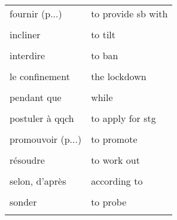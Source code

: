\documentclass[
  10pt,
]{article}
\begin{document}
\begin{longtable}{ll}
fournir (p...) & to provide sb with\\

\cellcolor{gray!6}{fournir (s...)} & \cellcolor{gray!6}{to supply sb with}\\

incliner & to tilt\\

\cellcolor{gray!6}{intenter un procès} & \cellcolor{gray!6}{to sue}\\

interdire & to ban\\

\cellcolor{gray!6}{la majorité écrasante} & \cellcolor{gray!6}{the overwhelming majority}\\

le confinement & the lockdown\\

\cellcolor{gray!6}{menacer} & \cellcolor{gray!6}{to threaten}\\

pendant que & while\\

\cellcolor{gray!6}{posséder qqch} & \cellcolor{gray!6}{to own stg}\\

postuler à qqch & to apply for stg\\

\cellcolor{gray!6}{promouvoir (a...)} & \cellcolor{gray!6}{to advertise}\\

promouvoir (p...) & to promote\\

\cellcolor{gray!6}{provenir de} & \cellcolor{gray!6}{to stem from}\\

résoudre & to work out\\

\cellcolor{gray!6}{s'accroupir} & \cellcolor{gray!6}{to croush}\\

selon, d'après & according to\\

\cellcolor{gray!6}{(se) terminer} & \cellcolor{gray!6}{to be over}\\

sonder & to probe\\

\cellcolor{gray!6}{un but, un objectif (a...)} & \cellcolor{gray!6}{an aim}\\


\end{longtable}
\end{document}
